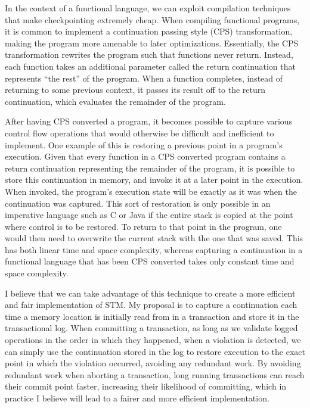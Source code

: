 \documentclass[12pt]{article}
\begin{document}
In the context of a functional language, we can exploit compilation techniques that make checkpointing extremely cheap.  When compiling functional programs, it is common to implement a continuation passing style (CPS) transformation, making the program more amenable to later optimizations.  Essentially, the CPS transformation rewrites the program such that functions never return.  Instead, each function takes an additional parameter called the return continuation that represents ``the rest'' of the program.  When a function completes, instead of returning to some previous context, it passes its result off to the return continuation, which evaluates the remainder of the program.

After having CPS converted a program, it becomes possible to capture various control flow operations that would otherwise be difficult and inefficient to implement.  One example of this is restoring a previous point in a program's execution.  Given that every function in a CPS converted program contains a return continuation representing the remainder of the program, it is possible to store this continuation in memory, and invoke it at a later point in the execution.  When invoked, the program's execution state will be exactly as it was when the continuation was captured.  This sort of restoration is only possible in an imperative language such as C or Java if the entire stack is copied at the point where control is to be restored.  To return to that point in the program, one would then need to overwrite the current stack with the one that was saved.  This has both linear time and space complexity, whereas capturing a continuation in a functional language that has been CPS converted takes only constant time and space complexity.

I believe that we can take advantage of this technique to create a more efficient and fair implementation of STM.  My proposal is to capture a continuation each time a memory location is initially read from in a transaction and store it in the transactional log.  When committing a transaction, as long as we validate logged operations in the order in which they happened, when a violation is detected, we can simply use the continuation stored in the log to restore execution to the exact point in which the violation occurred, avoiding any redundant work.  By avoiding redundant work when aborting a transaction, long running transactions can reach their commit point faster, increasing their likelihood of committing, which in practice I believe will lead to a fairer and more efficient implementation.
\end{document}
